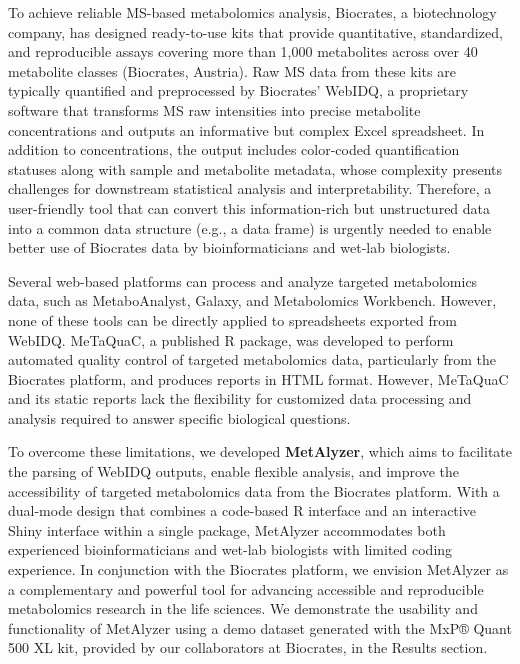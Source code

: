 \documentclass[12pt, a4paper]{article}
\begin{document}
To achieve reliable MS-based metabolomics analysis, Biocrates, a biotechnology company, has designed ready-to-use kits that provide quantitative, standardized, and reproducible assays covering more than 1,000 metabolites across over 40 metabolite classes (Biocrates, Austria). Raw MS data from these kits are typically quantified and preprocessed by Biocrates' WebIDQ, a proprietary software that transforms MS raw intensities into precise metabolite concentrations and outputs an informative but complex Excel spreadsheet. In addition to concentrations, the output includes color-coded quantification statuses along with sample and metabolite metadata, whose complexity presents challenges for downstream statistical analysis and interpretability. Therefore, a user-friendly tool that can convert this information-rich but unstructured data into a common data structure (e.g., a data frame) is urgently needed to enable better use of Biocrates data by bioinformaticians and wet-lab biologists.

Several web-based platforms can process and analyze targeted metabolomics data, such as MetaboAnalyst\cite{Pang2024}, Galaxy\cite{Galaxy2024}, and Metabolomics Workbench\cite{MWB}. However, none of these tools can be directly applied to spreadsheets exported from WebIDQ. MeTaQuaC\cite{Kuhring2020}, a published R package, was developed to perform automated quality control of targeted metabolomics data, particularly from the Biocrates platform, and produces reports in HTML format. However, MeTaQuaC and its static reports lack the flexibility for customized data processing and analysis required to answer specific biological questions.

To overcome these limitations, we developed \textbf{MetAlyzer}, which aims to facilitate the parsing of WebIDQ outputs, enable flexible analysis, and improve the accessibility of targeted metabolomics data from the Biocrates platform. With a dual-mode design that combines a code-based R interface and an interactive Shiny interface within a single package, MetAlyzer accommodates both experienced bioinformaticians and wet-lab biologists with limited coding experience. In conjunction with the Biocrates platform, we envision MetAlyzer as a complementary and powerful tool for advancing accessible and reproducible metabolomics research in the life sciences. We demonstrate the usability and functionality of MetAlyzer using a demo dataset generated with the MxP® Quant 500 XL kit, provided by our collaborators at Biocrates, in the Results section.
\end{document}
